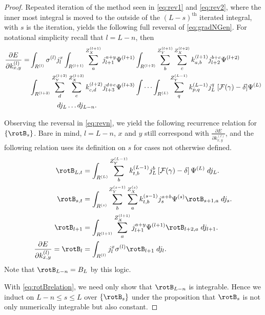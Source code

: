 \begin{proof}
  Repeated iteration of the method seen in \eqref{eq:rev1} and \eqref{eq:rev2}, where the inner most integral is moved to the outside of the $(L-s)^\mathrm{th}$ iterated integral, with $s$ is the iteration, yields the following full reversal of \eqref{eq:gradNGen}. For notational simplicity recall that $l = L-n$, then
 \begin{equation}\label{eq:revn}
  \begin{aligned}
    \frac{\partial E}{\partial k_{x,y}^{(l)}} =&
      \int_{R^{(l)}}  \sigma^{(l)}  j^{x}_{l}
      \int_{R^{(l+1)}} \sum_a^{Z^{(l+1)}_X} j_{l+1}^{a+y} \Psi^{(l+1)}
      \int_{R^{(l+2)}} \sum_b^{Z_Y^{(l+1)}} \sum_c^{Z_X^{(l+2)}}
         k^{(l+1)}_{a,b} j^{b+c}_{l+2} \Psi^{(l+2)} \\&
      \int_{R^{(l+3)}} \sum_d^{Z_Y^{(l+2)}} \sum_e^{Z_X^{(l+3)}}
         k^{(l+2)}_{c,d} j^{d+e}_{l+3} \Psi^{(l+3)} 
      \idotsint_{R^{(L)}} \sum_q^{Z^{(L-1)}_Y} k^{(L-1)}_{p,q} j_L^q 
       \; [\mathcal{F}(\gamma)-\delta] \Psi^{(L)} \\ &
      \qquad \qquad dj_{L}\dots dj_{L-n}.
  \end{aligned}
  \end{equation}

  Observing the reversal in \eqref{eq:revn}, we yield the following recurrence relation for $\{\rotB_s\}$. Bare in mind, $l= L-n$, $x$ and $y$ still correspond with $\frac{\partial E}{\partial k^{(l)}_{x,y}}$, and the following relation uses its definition on $s$ for cases not otherwise defined.
  \begin{equation} \label{eq:rotBrelation}
  \begin{aligned}
    \rotB_{L,t} &= \int_{R^{(L)}}  \sum_b^{Z^{(L-1)}_Y} k^{(L-1)}_{t,b} j_L^b 
      \left[\mathcal{F}(\gamma) - \delta\right] \Psi^{(L)}\;dj_L. \\
    \rotB_{s,t} &= \int_{R^{(s)}}\sum_b^{Z^{(s-1)}_Y} \sum_a^{Z^{(s)}_X} 
      k^{(s-1)}_{t,b} j_s^{a+b} \Psi^{(s)} \rotB_{s+1,a}\; dj_s. \\
    \rotB_{l+1} &= \int_{R^{(l+1)}} \sum_a^{Z^{(l+1)}_X}
      j^{a+y}_{l+1} \Psi^{(l+1)} \rotB_{l+2, a}\; dj_{l+1}. \\
     \frac{\partial E}{\partial k^{(l)}_{x,y}} = \rotB_{l} &= \int_{R^{(l)}}
      j_{l}^x \sigma^{(l)} \rotB_{l+1}\; dj_l.
  \end{aligned}
  \end{equation}
  Note that $\rotB_{L-n} = B_L$ by this logic.

  With \eqref{eq:rotBrelation}, we need only show that $\rotB_{L-n}$ is integrable. Hence we induct on $L-n \leq s \leq L$ over $\{\rotB_s\}$ under the proposition that $\rotB_s$ is not only numerically integrable but also constant. 


\end{proof}
